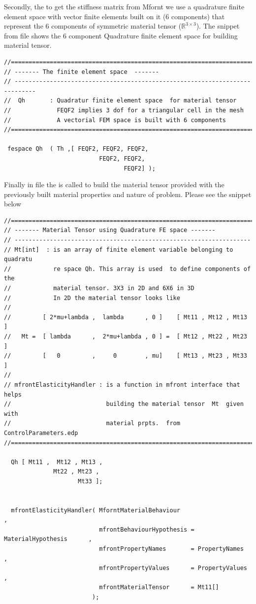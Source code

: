 Secondly, the to get the stiffness matrix from Mfornt we use a
quadrature finite element space with vector finite elements built on it
(6 components) that represent the 6 components of symmetric material
tensor (\(\mathbb R^{3 \times 3}\)). The snippet from
 file shows the 6 component Quadrature finite
element space for building material tensor.

\begin{lstlisting}[style=CppStyle]
//==============================================================================
// ------- The finite element space  -------
// ----------------------------------------------------------------------------
//  Qh       : Quadratur finite element space  for material tensor
//             FEQF2 implies 3 dof for a triangular cell in the mesh
//             A vectorial FEM space is built with 6 components
//==============================================================================

 fespace Qh  ( Th ,[ FEQF2, FEQF2, FEQF2,
                           FEQF2, FEQF2,
                                  FEQF2] );
\end{lstlisting}

Finally in file  the
 is called to build the material tensor
 provided with the previously built material properties and
nature of problem. Please see the snippet below

\begin{lstlisting}[style=CppStyle]
//============================================================================
// ------- Material Tensor using Quadrature FE space -------
// -------------------------------------------------------------------
// Mt[int]  : is an array of finite element variable belonging to quadratu
//            re space Qh. This array is used  to define components of the
//            material tensor. 3X3 in 2D and 6X6 in 3D
//            In 2D the material tensor looks like
//
//         [ 2*mu+lambda ,  lambda      , 0 ]    [ Mt11 , Mt12 , Mt13 ]
//   Mt =  [ lambda      ,  2*mu+lambda , 0 ] =  [ Mt12 , Mt22 , Mt23 ]
//         [   0         ,     0        , mu]    [ Mt13 , Mt23 , Mt33 ]
//
// mfrontElasticityHandler : is a function in mfront interface that helps
//                           building the material tensor  Mt  given with
//                           material prpts.  from  ControlParameters.edp
//============================================================================

  Qh [ Mt11 ,  Mt12 , Mt13 ,
              Mt22 , Mt23 ,
                     Mt33 ];


  mfrontElasticityHandler( MforntMaterialBehaviour                             ,
                           mfrontBehaviourHypothesis = MaterialHypothesis      ,
                           mfrontPropertyNames       = PropertyNames           ,
                           mfrontPropertyValues      = PropertyValues          ,
                           mfrontMaterialTensor      = Mt11[]
                         );
\end{lstlisting}

